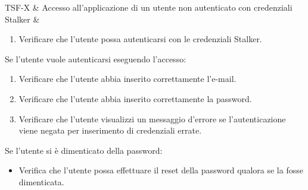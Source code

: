 

TSF-X & Accesso all'applicazione di un utente non autenticato con credenziali Stalker & \begin{enumerate}
    \item Verificare che l'utente possa autenticarsi con le credenziali Stalker.
\end{enumerate}
Se l'utente vuole autenticarsi eseguendo l'accesso:
\begin{enumerate}
    \item Verificare che l'utente abbia inserito correttamente l'e-mail.
    \item Verificare che l'utente abbia inserito correttamente la password.
    \item Verificare che l'utente visualizzi un messaggio d'errore se l'autenticazione viene negata per inserimento di credenziali errate.
\end{enumerate}
Se l'utente si è dimenticato della password:
\begin{itemize}
    \item Verifica che l'utente possa effettuare il reset della password qualora se la fosse dimenticata.
\end{itemize} \\

